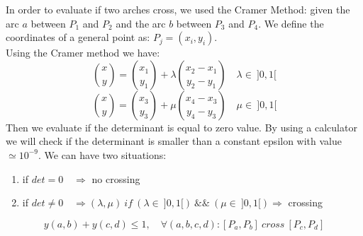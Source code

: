 In order to evaluate if two arches cross, we used the Cramer Method: given the arc $a$ between $P_1$ and $P_2$ and the arc $b$ between $P_3$ and $P_4$. We define the coordinates of a general point as: $P_j = (x_i, y_i)$. \\
Using the Cramer method we have:
\[
{x \choose y} = {x_1 \choose y_1}+ \lambda {x_2 - x_1 \choose y_2 - y_1} \quad \lambda \in \ ]0, 1[
\]   
\[
{x \choose y} = {x_3 \choose y_3}+ \mu {x_4 - x_3 \choose y_4 - y_3} \quad \mu \in \ ]0, 1[
\]    
Then we evaluate if the determinant is equal to zero value. By using a calculator we will check if the determinant is smaller than a constant epsilon with value $\simeq 10^{-9}$. We can have two situations:
\begin{enumerate}
\item if $det=0 \quad \Rightarrow$ no crossing 
\item if $det \neq 0 \quad \Rightarrow (\lambda, \mu) \ if \ (\lambda \in \ ]0, 1[) \ \&\& \ (\mu \in \ ]0, 1[) \Rightarrow $ crossing
\end{enumerate}                                                   

\[
y(a,b)+ y(c,d) \leq 1, \quad \forall (a,b,c,d): [P_a, P_b] \ cross \ [P_c, P_d]
\]

